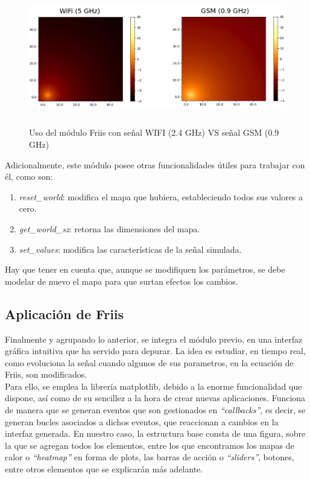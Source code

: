 \begin{figure} [tp]
	\begin{center}
	\includegraphics[height=6cm]{imagenes/cap4/4_heatmap_example.png}
	\end{center}
	\caption[Uso del módulo Friis con señal WIFI (5 GHz) VS señal GSM (0.9 GHz)]{Uso del módulo Friis con señal WIFI (2.4 GHz) VS señal GSM (0.9 GHz)}
	\label{fig:heat_ex}
\end{figure}

Adicionalmente, este módulo posee otras funcionalidades útiles para trabajar con él, como son:

\begin{enumerate}
    \item \emph{reset\_world}: modifica el mapa que hubiera, estableciendo todos sus valores a cero.
    \item \emph{get\_world\_sz}: retorna las dimensiones del mapa.
    \item \emph{set\_values}: modifica las características de la señal simulada.
\end{enumerate}

Hay que tener en cuenta que, aunque se modifiquen los parámetros, se debe modelar de nuevo el mapa para que surtan efectos los cambios.\\

\subsection{Aplicación de Friis}
\label{subsec:friis-app}

Finalmente y agrupando lo anterior, se integra el módulo previo, en una interfaz gráfica intuitiva que ha servido para depurar. La idea es estudiar, en tiempo real, como evoluciona la señal cuando algunos de sus parametros, en la ecuación de Friis, son modificados.\\

Para ello, se emplea la librería matplotlib, debido a la enorme funcionalidad que dispone, así como de su sencillez a la hora de crear nuevas aplicaciones. Funciona de manera que se generan eventos que son gestionados en \emph{``callbacks''}, es decir, se generan bucles asociados a dichos eventos, que reaccionan a cambios en la interfaz generada. En nuestro caso, la estructura base consta de una figura, sobre la que se agregan todos los elementos, entre los que encontramos los mapas de calor o \emph{``heatmap''} en forma de plots, las barras de acción o \emph{``sliders''}, botones, entre otros elementos que se explicarán más adelante.\\

